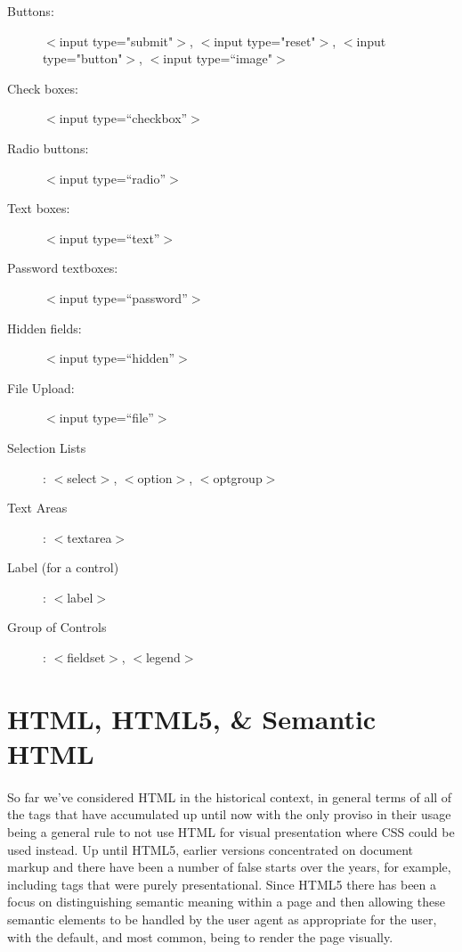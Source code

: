 \begin{description}
\item [ Buttons:] $<$input type="submit"$>$, $<$input type="reset"$>$, $<$input type="button"$>$, $<$input type=“image"$>$

\item [ Check boxes:] $<$input type=“checkbox”$>$

\item [ Radio buttons:] $<$input type=“radio”$>$

\item [ Text boxes:] $<$input type=“text”$>$

\item [ Password textboxes:] $<$input type=“password”$>$

\item [ Hidden fields:] $<$input type=“hidden”$>$

\item [ File Upload:] $<$input type=“file”$>$

\item [ Selection Lists]: $<$select$>$, $<$option$>$, $<$optgroup$>$

\item [ Text Areas]: $<$textarea$>$

\item [ Label (for a control)]: $<$label$>$

\item [Group of Controls]: $<$fieldset$>$, $<$legend$>$
\end{description}

\section{HTML, HTML5, \& Semantic HTML}
\paragraph{} So far we've considered HTML in the historical context, in general terms of all of the tags that have accumulated up until now with the only proviso in their usage being a general rule to not use HTML for visual presentation where CSS could be used instead. Up until HTML5, earlier versions concentrated on document markup and there have been a number of false starts over the years, for example, including tags that were purely presentational. Since HTML5 there has been a focus on distinguishing semantic meaning within a page and then allowing these semantic elements to be handled by the user agent as appropriate for the user, with the default, and most common, being to render the page visually.
